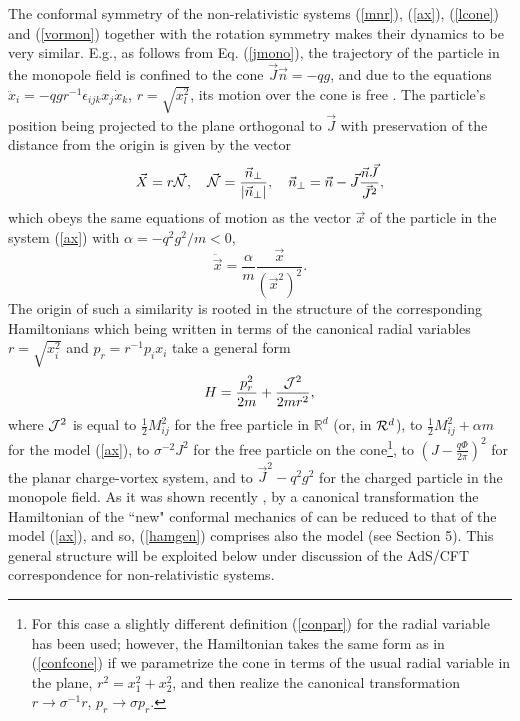 \documentclass[a4paper,12pt]{article}
\def\R{\mathbb R}
\begin{document}
The  conformal symmetry of the
non-relativistic systems
(\ref{mnr}), (\ref{ax}),
(\ref{lcone})
and (\ref{vormon})
together with the rotation symmetry
makes their dynamics to be very similar.
E.g., as follows from Eq.
(\ref{jmono}),
the trajectory of the particle in the monopole
field is confined to the
cone $\vec J\vec n=-qg$,
and due to the equations
$\ddot{x}_i=-qgr^{-1}\epsilon_{ijk}x_j\dot{x}_k$,
$r=\sqrt{x_l^2}$,
its motion over the cone is free \cite{mp}.
The particle's position
being projected to the plane orthogonal
to $\vec J$ with preservation of the distance
from the origin is
given by the vector
\[
\vec X=r\vec {\cal N},\quad \vec {\cal N}=
\frac{\vec n_\perp}{|\vec n_\perp|},\quad \vec n_\perp=
\vec n-\vec J
\frac{\vec n\vec J}{\vec J^2} ,
\]
which obeys the same equations of motion as the vector
$\vec x$ of the particle in the system
(\ref{ax}) with $\alpha=-q^2 g^2/m<0$,
\[
\ddot{\vec x}=\frac{\alpha}{m}\frac{\vec x}{(\vec x^2)^2}.
\]
The origin of such a similarity
is rooted in the structure
of the corresponding Hamiltonians
which being written in terms of
the canonical radial variables
$r=\sqrt{x_i^2}$ and
$p_r=r^{-1}p_ix_i$ take a general
form
\begin{equation}
H=\frac{p_r^2}{2m}+\frac{{\cal J}^2}{2mr^2},
\label{hamgen}
\end{equation}
where ${\cal J}^2$ is equal to
$\frac{1}{2}M_{ij}^2$ for the
free particle in $\R^d$
(or, in ${\cal R}^d$),
to $\frac{1}{2}M_{ij}^2+\alpha m$
for the model (\ref{ax}),
to $\sigma^{-2} J^2$ for the free particle
on the  cone\footnote{For this case
a slightly different definition (\ref{conpar})
for
the radial variable has been used;
however, the Hamiltonian takes the same form
as in (\ref{confcone})
if we parametrize the cone in terms of the usual
radial variable in the plane,
$r^2=x_1^2+x_2^2$, and then realize
the canonical transformation $r\rightarrow \sigma^{-1} r$,
$p_r\rightarrow \sigma p_r$.},
to $(J-\frac{q\Phi}{2\pi})^2$
for the planar charge-vortex system,
and to $\vec J^2-q^2g^2$ for the charged particle
in the monopole field.
As it was shown recently \cite{Bell},  by a canonical
transformation
the Hamiltonian of the ``new" conformal mechanics
of \cite{kallosh} can be reduced  to that of
the model (\ref{ax}), and so,
(\ref{hamgen}) comprises also
the model \cite{kallosh} (see Section 5).
This general structure will be exploited
below under discussion of the
AdS/CFT correspondence for non-relativistic
systems.
\end{document}

